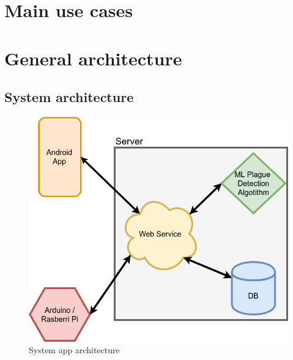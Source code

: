 \documentclass[11pt,a4paper]{article}
\begin{document}
\newpage

\section{Main use cases}

\section{General architecture}
\subsection{System architecture}
\begin{figure}[hbtp]
\centering
\includegraphics[scale=0.6]{figures/AppArchitecture.png}
\caption{System app architecture}
\end{figure}
\end{document}
